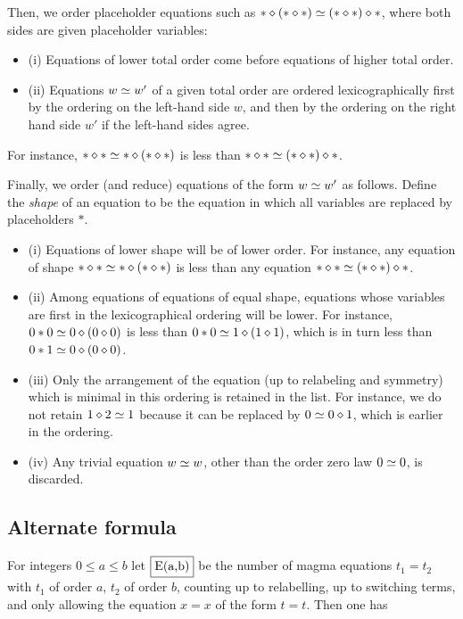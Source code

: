 Then, we order placeholder equations such as $\ast \diamond (\ast \diamond \ast) \simeq (\ast \diamond \ast) \diamond \ast$, where both sides are given placeholder variables:
\begin{itemize}
\item (i)  Equations of lower total order come before equations of higher total order.
\item (ii) Equations $w \simeq w'$ of a given total order are ordered lexicographically first by the ordering on the left-hand side $w$, and then by the ordering on the right hand side $w'$ if the left-hand sides agree.
\end{itemize}
For instance, $\ast \diamond \ast \simeq \ast \diamond (\ast \diamond \ast)$ is less than $\ast \diamond \ast \simeq (\ast \diamond \ast) \diamond \ast$.

Finally, we order (and reduce) equations of the form $w \simeq w'$ as follows. Define the \emph{shape} of an equation to be the equation in which all variables are replaced by placeholders $\ast$.
\begin{itemize}
  \item (i) Equations of lower shape will be of lower order.  For instance, any equation of shape $\ast \diamond \ast \simeq \ast \diamond (\ast \diamond \ast)$ is less than any equation $\ast \diamond \ast \simeq (\ast \diamond \ast) \diamond \ast$.
  \item (ii) Among equations of equations of equal shape, equations whose variables are first in the lexicographical ordering will be lower. For instance, $0 \ast 0 \simeq 0 \diamond (0 \diamond 0)$ is less than $0 \ast 0 \simeq 1 \diamond (1 \diamond 1)$, which is in turn less than $0 \ast 1 \simeq 0 \diamond (0 \diamond 0)$.
  \item (iii) Only the arrangement of the equation (up to relabeling and symmetry) which is minimal in this ordering is retained in the list.  For instance, we do not retain $1 \diamond 2 \simeq 1$ because it can be replaced by $0 \simeq 0 \diamond 1$, which is earlier in the ordering.
\item (iv) Any trivial equation $w \simeq w$, other than the order zero law $0 \simeq 0$, is discarded.
\end{itemize}

\subsection{Alternate formula}

For integers $0 \le a \le b$ let $\fbox{E(a,b)}$ be the number of magma equations $t_1 = t_2$ with $t_1$ of order $a$, $t_2$ of order $b$, counting up to relabelling, up to switching terms, and only allowing the equation $x=x$ of the form $t=t$.  Then one has


